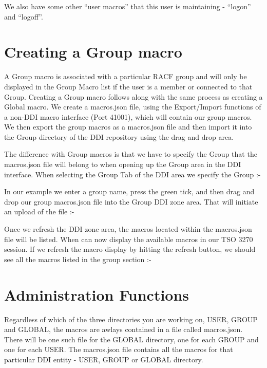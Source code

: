 \documentclass[letterpaper,10pt,english]{sphinxmanual}
\begin{document}

We also have some other “user macros” that this user is maintaining - “logon” and “logoff”.


\section{Creating a Group macro}
\label{\detokenize{TN202002:creating-a-group-macro}}
A Group macro is associated with a particular RACF group and will only be displayed in the Group Macro list if the user is a member or connected to that Group. Creating a Group macro follows along with the same process as creating a Global macro. We create a macros.json file, using the Export/Import functions of a non-DDI macro interface (Port 41001), which will contain our group macros. We then export the group macros as a macros.json file and then import it into the Group directory of the DDI repository using the drag and drop area.

The difference with Group macros is that we have to specify the Group that the macros.json file will belong to when opening up the Group area in the DDI interface. When selecting the Group Tab of the DDI area we specify the Group :-


In our example we enter a group name, press the green tick, and then drag and drop our group macros.json file into the Group DDI zone area. That will initiate an upload of the file :-


Once we refresh the DDI zone area, the macros located within the macros.json file will be listed. When can now display the available macros in our TSO 3270 session. If we refresh the macro display by hitting the refresh button, we should see all the macros listed in the group section :-




\section{Administration Functions}
\label{\detokenize{TN202002:administration-functions}}
Regardless of which of the three directories you are working on, USER, GROUP and GLOBAL, the macros are awlays contained in a file called macros.json. There will be one such file for the GLOBAL directory, one for each GROUP and one for each USER. The macros.json file contains all the macros for that particular DDI entity - USER, GROUP or GLOBAL directory.
\end{document}
